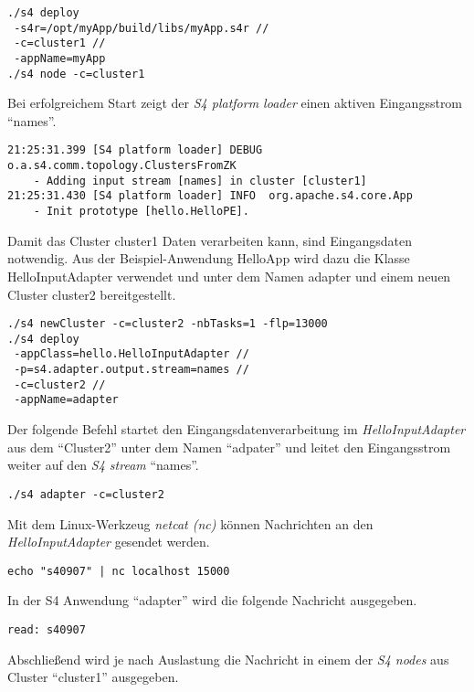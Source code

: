 \begin{verbatim}
./s4 deploy 
 -s4r=/opt/myApp/build/libs/myApp.s4r // 
 -c=cluster1 //
 -appName=myApp
./s4 node -c=cluster1
\end{verbatim}

Bei erfolgreichem Start zeigt der \textit{S4 platform loader} einen aktiven Eingangsstrom "`names"'.

\begin{verbatim}
21:25:31.399 [S4 platform loader] DEBUG o.a.s4.comm.topology.ClustersFromZK 
	- Adding input stream [names] in cluster [cluster1]
21:25:31.430 [S4 platform loader] INFO  org.apache.s4.core.App 
	- Init prototype [hello.HelloPE].
\end{verbatim}


Damit das Cluster cluster1 Daten verarbeiten kann, sind Eingangsdaten notwendig. Aus der Beispiel-Anwendung HelloApp wird dazu die Klasse HelloInputAdapter verwendet und unter dem Namen adapter und einem neuen Cluster cluster2 bereitgestellt.

\begin{verbatim}
./s4 newCluster -c=cluster2 -nbTasks=1 -flp=13000
./s4 deploy 
 -appClass=hello.HelloInputAdapter //
 -p=s4.adapter.output.stream=names //
 -c=cluster2 //
 -appName=adapter
\end{verbatim}

Der folgende Befehl startet den Eingangsdatenverarbeitung im \textit{HelloInputAdapter} aus dem "`Cluster2"' unter dem Namen "`adpater"' und leitet den Eingangsstrom weiter auf den \textit{S4 stream} "`names"'.

\begin{verbatim}
./s4 adapter -c=cluster2
\end{verbatim}

Mit dem Linux-Werkzeug \textit{netcat (nc)} können Nachrichten an den \textit{HelloInputAdapter} gesendet werden.

\begin{verbatim}
echo "s40907" | nc localhost 15000
\end{verbatim}

In der S4 Anwendung "`adapter"' wird die folgende Nachricht ausgegeben.

\begin{verbatim}
read: s40907
\end{verbatim}

Abschließend wird je nach Auslastung die Nachricht in einem der \textit{S4 nodes} aus Cluster "`cluster1"' ausgegeben.

